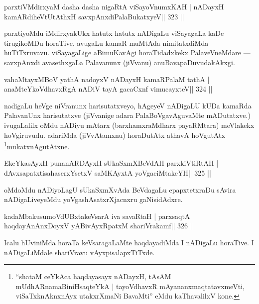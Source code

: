 
\begin{shl}
parxtiVMdirxyaM dasha dasha nigaRtA viSayoVnumxKAH |
nADayxH kamARdiheVtUtAthxH savxpAnxdiPalaBukatxyeV\hfill || 323 ||
\end{shl}

\begin{artha}
parxtiyoMdu iMdirxyakUkx hatutx hatutx nADigaLu viSayagaLa kaDe  tirugikoMDu horaTive, avugaLu kamaR muMtAda nimitatxdiMda huTiTxruvavu. viSaya\-gaLige aBimuKavAgi horaTidadxkekx PalaveVneMdare  {\rm ---}  savxpAnxdi avasethxgaLa Palavanunx (jiVva\-nu) anuBavapaDuvudakAkxgi.
\end{artha}

\begin{shl}
vahaMtayxMBoV yathA nadoyxV nADayxH kamaRPalaM tathA |
anaMteYkoVdhavxRgA nADiV tayA gacaCxnf vimucayxteV\hfill || 324 ||
\end{shl}

\begin{artha}
nadigaLu heVge niVranunx harisutatxveyo, hAgeyeV nADigaLU kUDa kamaRda 
PalavanUnx harisutatxve (jiVvanige adara PalaBoVgavAguvaMte 
mADutatxve.) ivu\-gaLalilx oMdu nADiyu mAtarx (barxhamxraMdharx 
payaRMtara) meVlakekx hoVgiruvudu. adariMda (jiVvAtamxnu) horaDutAtx 
athavA hoVgutAtx \footnote[5]{``shataM ceYkAca haqdayasayx nADayxH, 
tAsAM mUdhARnamaBiniHsaqteYkA | tayoVdhavxR mAyananxmaqtatavxmeVti, 
viSaTxknAknxnAyx utakxrXmaNi BavaMti'' eMdu kaThavalilxV kone.}mukatxnAgutAtxne.
\end{artha}

\begin{shl}
EkeYkasAyxH punanARDAyxH sUkaSxmXBeVdAH parxkiVtiRtAH |
dAvxsapatxtisahaserxYsetxV saMKAyxtA yoVgaciMtakeYH\hfill || 325 ||
\end{shl}

\begin{artha}\footnotemark[5]oMdoMdu nADiyoLagU sUkaSxmXvAda BeVdagaLu epapxtetxraDu sAvira nADigaLiveyeMdu yoVgashAsatxrXjacnxru gaNisidAdxre.
\end{artha}


\begin{shl}
kadaMbakusumoVdUBxtakeVsarA iva savaRtaH |
parxsaqtA haqdayAnAnxDoyxV yABivAyxRpatxM shariVrakamf\hfill || 326 ||
\end{shl}

\begin{artha}
Icalu hUviniMda horaTa keVsaragaLaMte haqdayadiMda I nADigaLu horaTive. I nADigaLiMdale shariVravu vAyxpisalapxTiTxde.
\end{artha}

